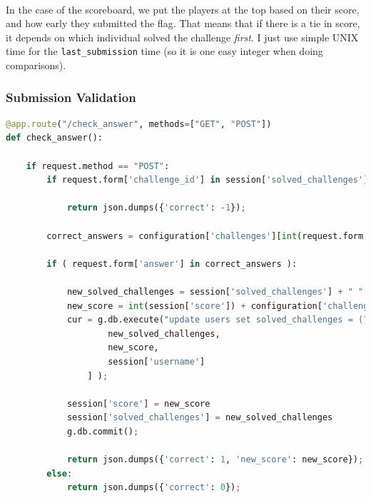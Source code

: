 \documentclass[11pt]{article}
\begin{document}
	\paragraph{} In the case of the scoreboard, we put the players at the top based on their score, and how early they submitted the flag. That means that if there is a tie in score, it depends on which individual solved the challenge \textit{first}. I just use simple UNIX time for the \texttt{last\_submission} time (so it is one easy integer when doing comparisons). 

	\paragraph{}

	\begin{center}
		\graphicspath{ {.} }
		\centering
	\end{center}
	
	\newpage

	\subsubsection{Submission Validation}

	\begin{lstlisting}[language=Python]
@app.route("/check_answer", methods=["GET", "POST"])
def check_answer(): 

	if request.method == "POST":
		if request.form['challenge_id'] in session['solved_challenges'].split():

			return json.dumps({'correct': -1});

		correct_answers = configuration['challenges'][int(request.form['challenge_id'])]["possible_answers"]

		if ( request.form['answer'] in correct_answers ):

			new_solved_challenges = session['solved_challenges'] + " " +request.form['challenge_id']
			new_score = int(session['score']) + configuration['challenges'][int(request.form['challenge_id'])]["points"]
			cur = g.db.execute("update users set solved_challenges = (?), score = (?), last_submission = (SELECT strftime('%s')) where username = (?)", [
					new_solved_challenges,
					new_score, 
					session['username']
				] );

			session['score'] = new_score
			session['solved_challenges'] = new_solved_challenges
			g.db.commit();

			return json.dumps({'correct': 1, 'new_score': new_score});
		else:
			return json.dumps({'correct': 0});
\end{lstlisting}
\end{document}
